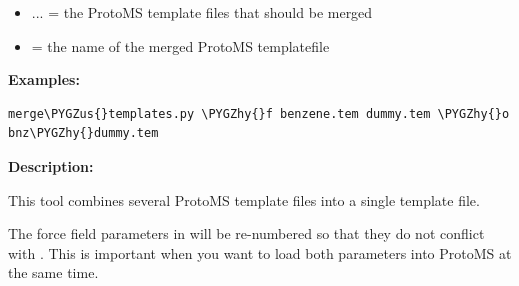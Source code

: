 \documentclass[letterpaper,10pt,english]{sphinxmanual}
\def\PYGZus{\char`\_}
\def\PYGZhy{\char`\-}
\begin{document}
\begin{itemize}
\item {} 
 ... = the ProtoMS template files that should be merged

\item {} 
 = the name of the merged ProtoMS templatefile

\end{itemize}

\textbf{Examples:}

\begin{Verbatim}[commandchars=\\\{\}]
merge\PYGZus{}templates.py \PYGZhy{}f benzene.tem dummy.tem \PYGZhy{}o bnz\PYGZhy{}dummy.tem
\end{Verbatim}

\textbf{Description:}

This tool combines several ProtoMS template files into a single template file.

The force field parameters in  will be re-numbered so that they do not conflict with . This is important when you want to load both parameters into ProtoMS at the same time.
\end{document}

